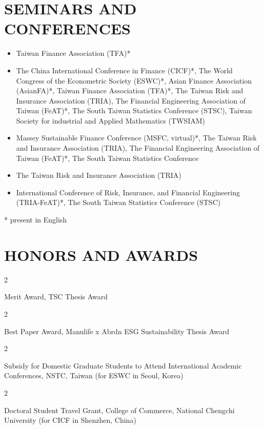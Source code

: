 \documentclass[12pt, letterpaper]{article}
\newenvironment{twocolentry}[2][]{
    \onecolentry
    \def\secondColumn{#2}
    \setcolumnwidth{\fill, 3.5 cm}
    \begin{paracol}{2}
}{
    \switchcolumn \raggedleft \secondColumn
    \end{paracol}
    \endonecolentry
} %
\begin{document}
    \section{SEMINARS AND CONFERENCES}
    \begin{itemize}
        \item[2026] Taiwan Finance Association (TFA)*
        \item[2025] The China International Conference in Finance (CICF)*, The World Congress of the Econometric Society (ESWC)*, Asian Finance Association (AsianFA)*, Taiwan Finance Association (TFA)*, The Taiwan Risk and Insurance Association (TRIA), The Financial Engineering Association of Taiwan (FeAT)*, The South Taiwan Statistics Conference (STSC), Taiwan Society for industrial and Applied Mathematics (TWSIAM)
        \item[2024] Massey Sustainable Finance Conference (MSFC, virtual)*, The Taiwan Risk and Insurance Association (TRIA), The Financial Engineering Association of Taiwan (FeAT)*, The South Taiwan Statistics Conference
        \item[2023] The Taiwan Risk and Insurance Association (TRIA)
        \item[2022] International Conference of Risk, Insurance, and Financial Engineering (TRIA-FeAT)*, The South Taiwan Statistics Conference (STSC)
    \end{itemize}
    * present in English

    \section{HONORS AND AWARDS}

    \begin{twocolentry}{2026}
        Merit Award, TSC Thesis Award
    \end{twocolentry}
    \vspace{0.2cm}
    \begin{twocolentry}{2026}
        Best Paper Award, Manulife x Abrdn ESG Sustainability Thesis Award
    \end{twocolentry}
    \vspace{0.2cm}
    \begin{twocolentry}{2025}
        Subsidy for Domestic Graduate Students to Attend International Academic Conferences, NSTC, Taiwan (for ESWC in Seoul, Korea)
    \end{twocolentry}

    \vspace{0.2 cm}
    \begin{twocolentry}{2025}
        Doctoral Student Travel Grant, College of Commerce, National Chengchi University (for CICF in Shenzhen, China)
    \end{twocolentry}
\end{document}
